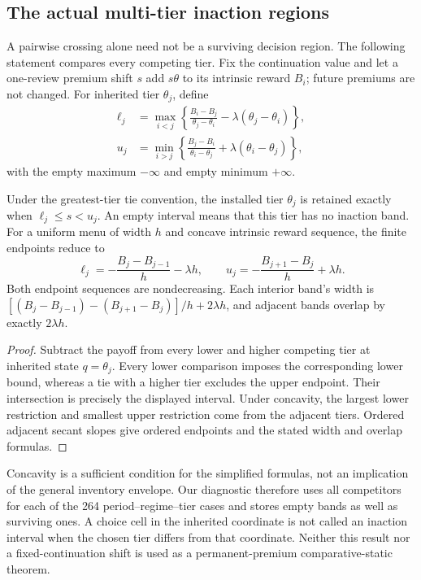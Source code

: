 \subsection{The actual multi-tier inaction regions}\label{sec:multi-inaction}
A pairwise crossing alone need not be a surviving decision region. The following statement compares every competing tier. Fix the continuation value and let a one-review premium shift $s$ add $s\theta$ to its intrinsic reward $B_i$; future premiums are not changed. For inherited tier $\theta_j$, define
\begin{align*}
 \ell_j&=\max_{i<j}\left\{\frac{B_i-B_j}{\theta_j-\theta_i}-\lambda(\theta_j-\theta_i)\right\},\\
 u_j&=\min_{i>j}\left\{\frac{B_j-B_i}{\theta_i-\theta_j}+\lambda(\theta_i-\theta_j)\right\},
\end{align*}
with the empty maximum $-\infty$ and empty minimum $+\infty$.
\begin{proposition}\label{prop:multi-inaction}
Under the greatest-tier tie convention, the installed tier $\theta_j$ is retained exactly when $\ell_j\leq s<u_j$. An empty interval means that this tier has no inaction band. For a uniform menu of width $h$ and concave intrinsic reward sequence, the finite endpoints reduce to
\[
 \ell_j=-\frac{B_j-B_{j-1}}h-\lambda h,\qquad
 u_j=-\frac{B_{j+1}-B_j}h+\lambda h.
\]
Both endpoint sequences are nondecreasing. Each interior band's width is
$[(B_j-B_{j-1})-(B_{j+1}-B_j)]/h+2\lambda h$, and adjacent bands overlap by exactly $2\lambda h$.
\end{proposition}
\begin{proof}
Subtract the payoff from every lower and higher competing tier at inherited state $q=\theta_j$. Every lower comparison imposes the corresponding lower bound, whereas a tie with a higher tier excludes the upper endpoint. Their intersection is precisely the displayed interval. Under concavity, the largest lower restriction and smallest upper restriction come from the adjacent tiers. Ordered adjacent secant slopes give ordered endpoints and the stated width and overlap formulas.
\end{proof}
Concavity is a sufficient condition for the simplified formulas, not an implication of the general inventory envelope. Our diagnostic therefore uses all competitors for each of the 264 period--regime--tier cases and stores empty bands as well as surviving ones. A choice cell in the inherited coordinate is not called an inaction interval when the chosen tier differs from that coordinate. Neither this result nor a fixed-continuation shift is used as a permanent-premium comparative-static theorem.
